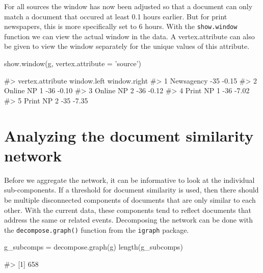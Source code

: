 \begin{Schunk}
\end{Schunk}

For all sources the window has now been adjusted so that a document can
only match a document that occured at least 0.1 hours earlier. But for
print newspapers, this is more specifically set to 6 hours. With the
\texttt{show.window} function we can view the actual window in the data.
A vertex.attribute can also be given to view the window separately for
the unique values of this attribute.

\begin{Schunk}
\begin{Sinput}
show.window(g, vertex.attribute = 'source')
\end{Sinput}
\begin{Soutput}
#>   vertex.attribute window.left window.right
#> 1       Newsagency         -35        -0.15
#> 2      Online NP 1         -36        -0.10
#> 3      Online NP 2         -36        -0.12
#> 4       Print NP 1         -36        -7.02
#> 5       Print NP 2         -35        -7.35
\end{Soutput}
\end{Schunk}

\section{Analyzing the document similarity
network}\label{analyzing-the-document-similarity-network}

Before we aggregate the network, it can be informative to look at the
individual sub-components. If a threshold for document similarity is
used, then there should be multiple disconnected components of documents
that are only similar to each other. With the current data, these
components tend to reflect documents that address the same or related
events. Decomposing the network can be done with the
\texttt{decompose.graph()} function from the \texttt{igraph} package.

\begin{Schunk}
\begin{Sinput}
g_subcomps = decompose.graph(g)
length(g_subcomps)
\end{Sinput}
\begin{Soutput}
#> [1] 658
\end{Soutput}
\end{Schunk}

